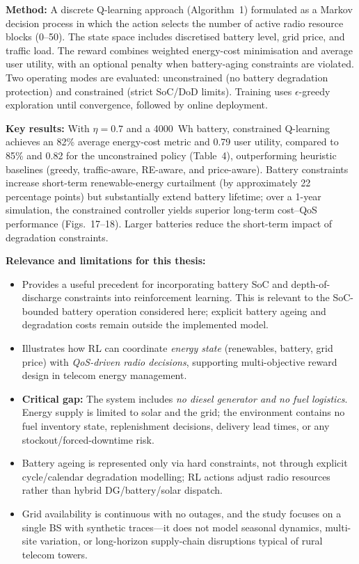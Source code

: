 \textbf{Method:} A discrete Q-learning approach (Algorithm~1) formulated as a Markov decision process in which the action selects the number of active radio resource blocks (0--50). The state space includes discretised battery level, grid price, and traffic load. The reward combines weighted energy-cost minimisation and average user utility, with an optional penalty when battery-aging constraints are violated. Two operating modes are evaluated: unconstrained (no battery degradation protection) and constrained (strict SoC/DoD limits). Training uses $\epsilon$-greedy exploration until convergence, followed by online deployment.

\textbf{Key results:} With $\eta = 0.7$ and a 4000~Wh battery, constrained Q-learning achieves an 82\% average energy-cost metric and 0.79 user utility, compared to 85\% and 0.82 for the unconstrained policy (Table~4), outperforming heuristic baselines (greedy, traffic-aware, RE-aware, and price-aware). Battery constraints increase short-term renewable-energy curtailment (by approximately 22 percentage points) but substantially extend battery lifetime; over a 1-year simulation, the constrained controller yields superior long-term cost--QoS performance (Figs.~17--18). Larger batteries reduce the short-term impact of degradation constraints.

\textbf{Relevance and limitations for this thesis:}
\begin{itemize}
    \item Provides a useful precedent for incorporating battery
SoC and depth-of-discharge constraints into reinforcement
learning. This is relevant to the SoC-bounded battery
operation considered here; explicit battery ageing and
degradation costs remain outside the implemented model.
    \item Illustrates how RL can coordinate \emph{energy state} (renewables, battery, grid price) with \emph{QoS-driven radio decisions}, supporting multi-objective reward design in telecom energy management.
    \item \textbf{Critical gap:} The system includes \emph{no diesel generator and no fuel logistics}. Energy supply is limited to solar and the grid; the environment contains no fuel inventory state, replenishment decisions, delivery lead times, or any stockout/forced-downtime risk.
    \item Battery ageing is represented only via hard constraints, not through explicit cycle/calendar degradation modelling; RL actions adjust radio resources rather than hybrid DG/battery/solar dispatch.
    \item Grid availability is continuous with no outages, and the study focuses on a single BS with synthetic traces---it does not model seasonal dynamics, multi-site variation, or long-horizon supply-chain disruptions typical of rural telecom towers.
\end{itemize}

